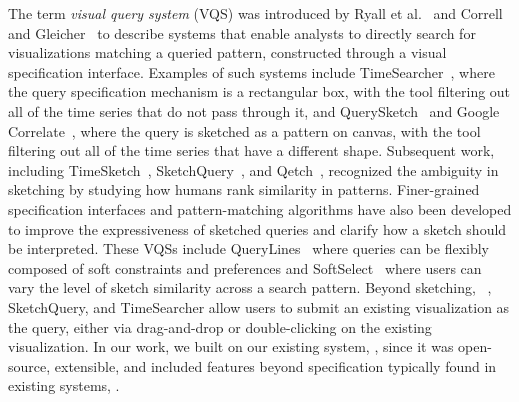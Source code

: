   \npar The term \emph{visual query system} (VQS) was introduced by Ryall et al.~\cite{ryall2005querylines} and Correll and Gleicher~\cite{correll2016semantics} to describe systems that enable analysts to directly search for  visualizations matching a queried pattern, constructed through a visual specification interface. Examples of such systems include TimeSearcher~\cite{Hochheiser2001,Hochheiser2004}, where the query specification mechanism is a rectangular box, with the tool filtering out all of the time series that do not pass through it, and QuerySketch~\cite{wattenberg2001sketching} and Google Correlate~\cite{mohebbi2011google}, where the query is sketched as a pattern on canvas, with the tool filtering out all of the time series that have a different shape. Subsequent work, including TimeSketch~\cite{Eichmann2015}, SketchQuery~\cite{correll2016semantics}, and Qetch~\cite{Mannino2018}, recognized the ambiguity in sketching by studying how humans rank similarity in patterns. Finer-grained specification interfaces and pattern-matching algorithms have also been developed to improve the expressiveness of sketched queries and clarify how a sketch should be interpreted. These VQSs include QueryLines~\cite{ryall2005querylines} where queries can be flexibly composed of soft constraints and preferences and SoftSelect~\cite{Holz2009} where users can vary the level of sketch similarity across a search pattern. Beyond sketching, \zv~\cite{Siddiqui2017,Siddiqui2017VLDB}, SketchQuery, and TimeSearcher allow users to submit an existing visualization as the query, either via drag-and-drop or double-clicking on the existing visualization. In our work, we built on our existing system, \zv, since it was open-source, extensible, and included features beyond  specification typically found in existing systems, . %
